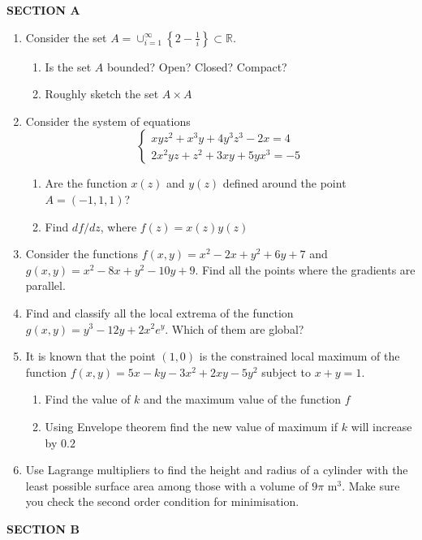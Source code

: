 \documentclass[12pt,a4paper]{article}
\begin{document}
\textbf{SECTION A}


\begin{enumerate}
\item Consider the set $A=\cup_{i=1}^{\infty} \left\{ 2-\frac{1}{i} \right\} \subset \mathbb{R}$.
\begin{enumerate}
\item Is the set $A$ bounded? Open? Closed? Compact?
\item Roughly sketch the set $A \times A$
\end{enumerate}

\item Consider the system of equations 
\[
\begin{cases}
xyz^2+x^3y+4y^3z^3-2x=4 \\
2x^2yz+z^2+3xy+5yx^3=-5
\end{cases}
\]
\begin{enumerate}
\item Are the function $x(z)$ and $y(z)$ defined around the point $A=(-1,1,1)$?
\item Find $df/dz$, where $f(z)=x(z)y(z)$
\end{enumerate}
\item Consider the functions $f(x,y)=x^2-2x+y^2+6y+7$ and $g(x,y)=x^2-8x+y^2-10y+9$. Find all the points where the gradients are parallel.
\item Find and classify all the local extrema of the function $g(x,y)=y^3 -12y+2x^2e^y$. Which of them are global?
\item It is known that the point $(1,0)$ is the constrained local maximum of the function $f(x,y)=5x-ky-3x^2+2xy-5y^2$ subject to $x+y=1$.
\begin{enumerate}
\item Find the value of $k$ and the maximum value of the function $f$
\item Using Envelope theorem find the new value of maximum if $k$ will increase by $0.2$
\end{enumerate}
\item Use Lagrange multipliers to find the height and radius of a cylinder with the least possible
surface area among those with a volume of $9\pi$ m$^3$. Make sure you check the second order
condition for minimisation.
\end{enumerate}

\textbf{SECTION B}
\end{document}
